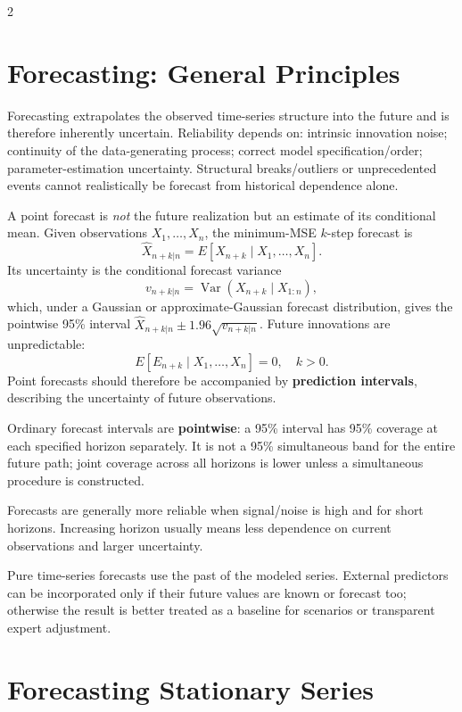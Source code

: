 \documentclass[9pt,a4paper]{extarticle}
\newcommand{\key}[1]{\textbf{#1}}
\begin{document}
\begin{multicols}{2}
\raggedcolumns

\section{Forecasting: General Principles}

Forecasting extrapolates the observed time-series structure into the future and is therefore inherently uncertain. Reliability depends on: intrinsic innovation noise; continuity of the data-generating process; correct model specification/order; parameter-estimation uncertainty. Structural breaks/outliers or unprecedented events cannot realistically be forecast from historical dependence alone.

A point forecast is \emph{not} the future realization but an estimate of its conditional mean. Given observations \(X_1,\ldots,X_n\), the minimum-MSE \(k\)-step forecast is
\[
\boxed{\widehat X_{n+k|n}=E[X_{n+k}\mid X_1,\ldots,X_n].}
\]
Its uncertainty is the conditional forecast variance
\[
v_{n+k|n}=\operatorname{Var}(X_{n+k}\mid X_{1:n}),
\]
which, under a Gaussian or approximate-Gaussian forecast distribution, gives the pointwise 95\% interval \(\widehat X_{n+k|n}\pm1.96\sqrt{v_{n+k|n}}\).
Future innovations are unpredictable:
\[
\boxed{E[E_{n+k}\mid X_1,\ldots,X_n]=0,\quad k>0.}
\]
Point forecasts should therefore be accompanied by \key{prediction intervals}, describing the uncertainty of future observations.

Ordinary forecast intervals are \key{pointwise}: a 95\% interval has 95\% coverage at each specified horizon separately. It is not a 95\% simultaneous band for the entire future path; joint coverage across all horizons is lower unless a simultaneous procedure is constructed.

Forecasts are generally more reliable when signal/noise is high and for short horizons. Increasing horizon usually means less dependence on current observations and larger uncertainty.

Pure time-series forecasts use the past of the modeled series. External predictors can be incorporated only if their future values are known or forecast too; otherwise the result is better treated as a baseline for scenarios or transparent expert adjustment.

\section{Forecasting Stationary Series}


\end{multicols}
\end{document}
